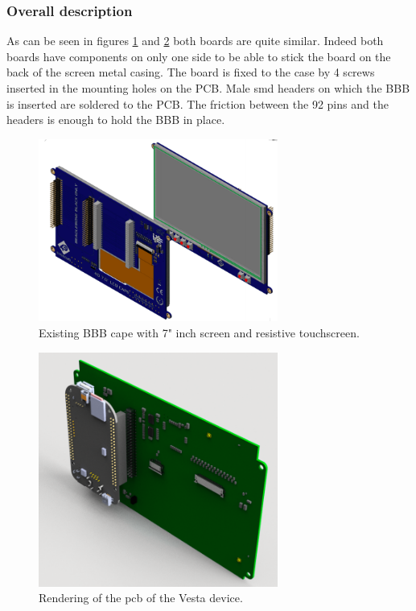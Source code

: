 \subsubsection{Overall description}

As can be seen in figures \ref{fig:4ds cape} and \ref{fig:vesta cape} both boards are quite similar. Indeed both boards have components on only one side to be able to stick the board on the back of the screen metal casing. The board is fixed to the case by 4 screws inserted in the mounting holes on the PCB.
Male smd headers on which the BBB is inserted are soldered to the PCB. The friction between the 92 pins and the headers is enough to hold the BBB in place.

\begin{figure}[h]
    \centering
    \includegraphics[width=0.7\textwidth,keepaspectratio]{chap/hardFig/4d_cape}
    \caption{Existing BBB cape with 7" inch screen and resistive touchscreen.}
    \label{fig:4ds cape}
\end{figure}

\begin{figure}[!ht]
    \centering
    \includegraphics[width=0.7\textwidth,keepaspectratio]{chap/hardFig/rendu_pcb_trois_quarts}
    \caption{Rendering of the pcb of the Vesta device.}
    \label{fig:vesta cape}
\end{figure}



